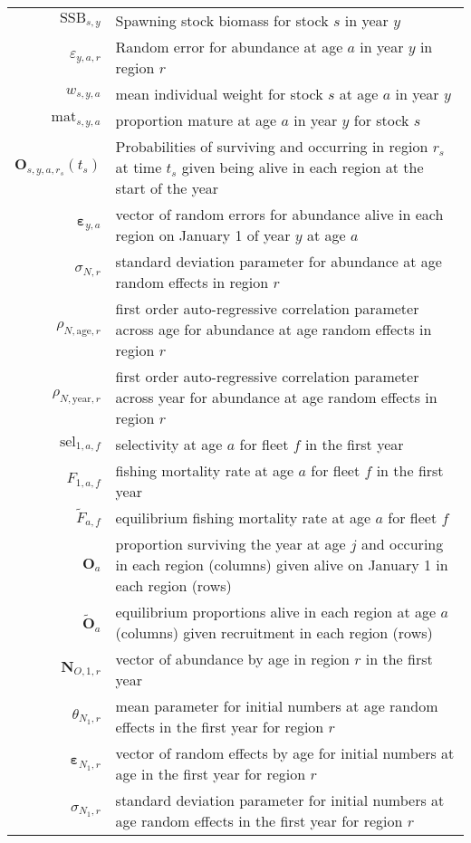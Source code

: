 \begin{longtable}[c]{r p{}}
$\text{SSB}_{s,y}$ & Spawning stock biomass for stock $s$ in year $y$\\
$\varepsilon_{y,a,r}$ & Random error for abundance at age $a$ in year $y$ in region $r$\\
$w_{s,y,a}$ & mean individual weight for stock $s$ at age $a$ in year $y$\\
$\text{mat}_{s,y,a}$ & proportion mature at age $a$ in year $y$ for stock $s$\\
$\mathbf{O}_{s,y,a,r_s}(t_s)$ & Probabilities of surviving and occurring in region $r_s$ at time $t_s$ given being alive in each region at the start of the year\\
$\boldsymbol{\varepsilon}_{y,a}$ & vector of random errors for abundance alive in each region on January 1 of year $y$ at age $a$\\
$\sigma_{N,r}$ & standard deviation parameter for abundance at age random effects in region $r$\\
$\rho_{N,\text{age},r}$ & first order auto-regressive correlation parameter across age for abundance at age random effects in region $r$\\
$\rho_{N,\text{year},r}$ & first order auto-regressive correlation parameter across year for abundance at age random effects in region $r$\\
$\text{sel}_{1,a,f}$ & selectivity at age $a$ for fleet $f$ in the first year\\
$F_{1,a,f}$ & fishing mortality rate at age $a$ for fleet $f$ in the first year\\
$\widetilde{F}_{a,f}$ & equilibrium fishing mortality rate at age $a$ for fleet $f$\\
$\mathbf{O}_{a}$ & proportion surviving the year at age $j$ and occuring in each region (columns) given alive on January 1 in each region (rows)\\
$\widetilde{\mathbf{O}}_{a}$ & equilibrium proportions alive in each region at age $a$ (columns) given recruitment in each region (rows)\\
$\mathbf{N}_{O,1,r}$ & vector of abundance by age in region $r$ in the first year\\
$\theta_{N_1,r}$ & mean parameter for initial numbers at age random effects in the first year for region $r$\\
$\boldsymbol{\varepsilon}_{N_1,r}$ & vector of random effects by age for initial numbers at age in the first year for region $r$\\ 
$\sigma_{N_1,r}$ & standard deviation parameter for initial numbers at age random effects in the first year for region $r$\\

\end{longtable}

